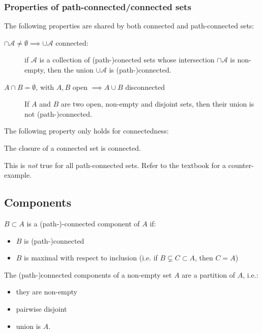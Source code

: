 \subsubsection{Properties of path-connected/connected sets}

\begin{thm*}
    The following properties are shared by both connected and path-connected sets:
    \begin{description}
        \item[$\cap \mathcal{A} \neq \emptyset \implies \cup \mathcal{A}$ connected: ] if $\mathcal{A}$ is a collection of (path-)conected sets whose intersection $\cap \mathcal{A}$ is non-empty, then the union $\cup \mathcal{A}$ is (path-)connected.
        \item[$A \cap B = \emptyset$, with $A,B$ open $ \implies A\cup B$ disconnected] If $A$ and $B$ are two open, non-empty and disjoint sets, then their union is not (path-)connected.
    \end{description}
\end{thm*}

The following property only holds for connectedness:
\begin{thm*}
    The closure of a connected set is connected.
\end{thm*}

\begin{note}
    This is \emph{not} true for all path-connected sets. Refer to the textbook for a counter-example.
\end{note}

\subsection{Components}
\begin{defi}
    $B\subset A$ is a (path-)-connected component of $A$ if:

    \begin{itemize}
        \item $B$ is (path-)connected
        \item $B$ is maximal with respect to inclusion (i.e. if $B\subsetneq C\subset A$, then $C=A$)
    \end{itemize}
\end{defi}

\begin{thm*}
    The (path-)connected components of a non-empty set $A$ are a partition of $A$, i.e.:
    \begin{itemize}
        \item they are non-empty
        \item pairwise disjoint 
        \item union is $A$.
    \end{itemize}
\end{thm*}

